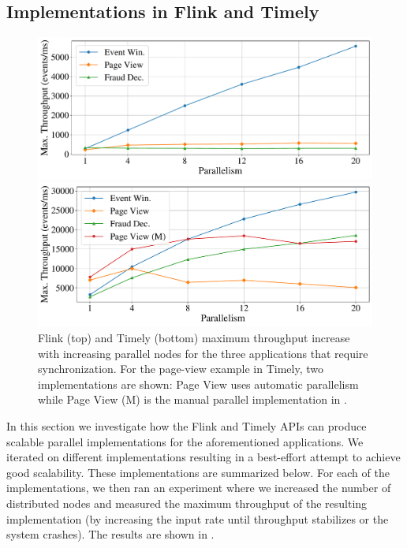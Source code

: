 \subsection{Implementations in Flink and Timely}
\label{dgs:ssec:eval-existing-implementations}

\begin{figure}[t]
  \centering
  \includegraphics[width=0.8\columnwidth]{figures/dgs/flink_max_throughput_scaleup}

  \includegraphics[width=0.8\columnwidth]{figures/dgs/timely_max_throughput_scaleup}
  \caption[Flink and Timely throughput experiments.]{
  Flink (top) and Timely (bottom) maximum throughput increase with increasing parallel nodes for the three applications that require synchronization.
  For the page-view example in Timely, two implementations are shown: Page View uses automatic
  parallelism while Page View (M) is the manual parallel implementation
  in .
  }
  \label{dgs:fig:existing-implementations-scaling}
\end{figure}

In this section we investigate how the Flink and Timely APIs can produce scalable parallel implementations for the aforementioned applications.
We iterated on different implementations resulting in a best-effort attempt to achieve good scalability. These implementations are summarized below.
For each of the implementations, we then ran an experiment where we increased the number of distributed nodes and measured the maximum throughput of the resulting implementation (by increasing the input rate until throughput stabilizes or the system crashes).
The results are shown in .

